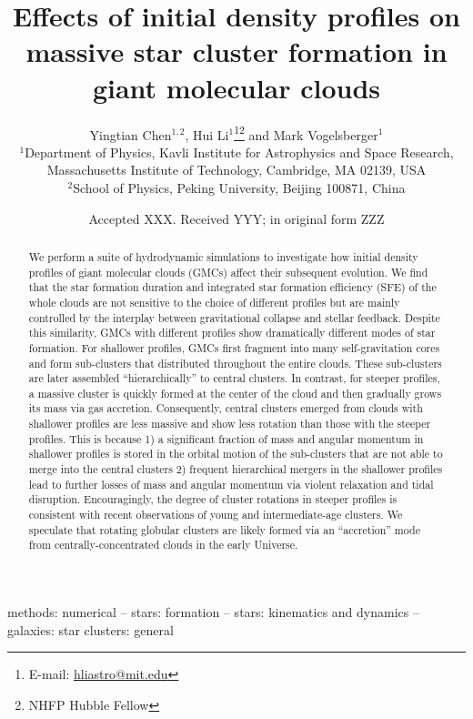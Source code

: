 \documentclass[fleqn,usenatbib]{mnras}
\title[GMCs with different density profiles]{Effects of initial density profiles on massive star cluster formation in giant molecular clouds}
\author[Y. Chen, H. Li, and M. Vogelsberger]{Yingtian Chen$^{1,2}$\orcid{0000-0002-5970-2563}, 
  Hui Li$^{1}$\orcid{0000-0002-1253-2763}\thanks{E-mail: \href{mailto:hliastro@mit.edu}{hliastro@mit.edu}}\thanks{NHFP Hubble Fellow}
  and Mark Vogelsberger$^{1}$\orcid{0000-0001-8593-7692}
  \\
$^{1}$Department of Physics, Kavli Institute for Astrophysics and Space Research, Massachusetts Institute of Technology, Cambridge, MA 02139, USA\\
$^{2}$School of Physics, Peking University, Beijing 100871, China
}
\date{Accepted XXX. Received YYY; in original form ZZZ}
\begin{document}
\label{firstpage}
\pagerange{\pageref{firstpage}--\pageref{lastpage}}
\maketitle

\begin{abstract}
We perform a suite of hydrodynamic simulations to investigate how initial density profiles of giant molecular clouds (GMCs) affect their subsequent evolution. We find that the star formation duration and integrated star formation efficiency (SFE) of the whole clouds are not sensitive to the choice of different profiles but are mainly controlled by the interplay between gravitational collapse and stellar feedback. Despite this similarity, GMCs with different profiles show dramatically different modes of star formation. For shallower profiles, GMCs first fragment into many self-gravitation cores and form sub-clusters that distributed throughout the entire clouds. These sub-clusters are later assembled ``hierarchically'' to central clusters.  In contrast, for steeper profiles, a massive cluster is quickly formed at the center of the cloud and then gradually grows its mass via gas accretion. Consequently, central clusters emerged from clouds with shallower profiles are less massive and show less rotation than those with the steeper profiles. This is because 1) a significant fraction of mass and angular momentum in shallower profiles is stored in the orbital motion of the sub-clusters that are not able to merge into the central clusters 2) frequent hierarchical mergers in the shallower profiles lead to further losses of mass and angular momentum via violent relaxation and tidal disruption. Encouragingly, the degree of cluster rotations in steeper profiles is consistent with recent observations of young and intermediate-age clusters. We speculate that rotating globular clusters are likely formed via an ``accretion'' mode from centrally-concentrated clouds in the early Universe.
\end{abstract}

\begin{keywords}
methods: numerical -- stars: formation -- stars: kinematics and dynamics -- galaxies: star clusters: general
\end{keywords}

\end{document}

